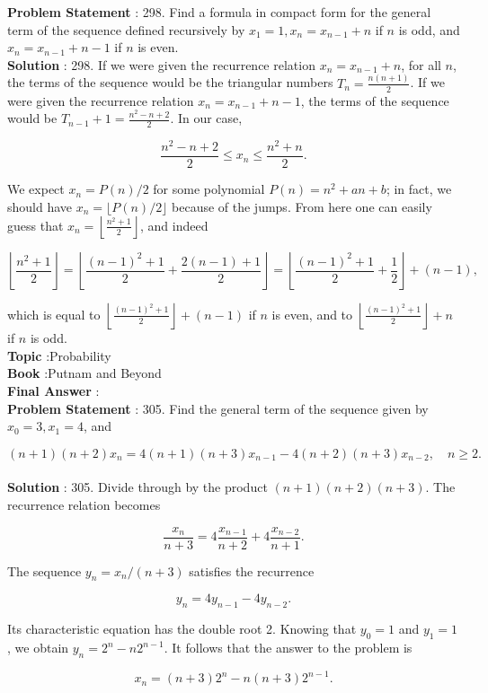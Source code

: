 \documentclass[10pt]{article}
\begin{document}
\textbf{Problem Statement} :
298. Find a formula in compact form for the general term of the sequence defined recursively by $x_{1}=1, x_{n}=x_{n-1}+n$ if $n$ is odd, and $x_{n}=x_{n-1}+n-1$ if $n$ is even.
\\
\textbf{Solution} :
298. If we were given the recurrence relation $x_{n}=x_{n-1}+n$, for all $n$, the terms of the sequence would be the triangular numbers $T_{n}=\frac{n(n+1)}{2}$. If we were given the recurrence relation $x_{n}=x_{n-1}+n-1$, the terms of the sequence would be $T_{n-1}+1=\frac{n^{2}-n+2}{2}$. In our case,

$$
\frac{n^{2}-n+2}{2} \leq x_{n} \leq \frac{n^{2}+n}{2} .
$$

We expect $x_{n}=P(n) / 2$ for some polynomial $P(n)=n^{2}+a n+b$; in fact, we should have $x_{n}=\lfloor P(n) / 2\rfloor$ because of the jumps. From here one can easily guess that $x_{n}=\left\lfloor\frac{n^{2}+1}{2}\right\rfloor$, and indeed

$$
\left\lfloor\frac{n^{2}+1}{2}\right\rfloor=\left\lfloor\frac{(n-1)^{2}+1}{2}+\frac{2(n-1)+1}{2}\right\rfloor=\left\lfloor\frac{(n-1)^{2}+1}{2}+\frac{1}{2}\right\rfloor+(n-1),
$$

which is equal to $\left\lfloor\frac{(n-1)^{2}+1}{2}\right\rfloor+(n-1)$ if $n$ is even, and to $\left\lfloor\frac{(n-1)^{2}+1}{2}\right\rfloor+n$ if $n$ is odd. 
\\
\textbf{Topic} :Probability\\
\textbf{Book} :Putnam and Beyond\\
\textbf{Final Answer} :\\


\textbf{Problem Statement} :
305. Find the general term of the sequence given by $x_{0}=3, x_{1}=4$, and

$$
(n+1)(n+2) x_{n}=4(n+1)(n+3) x_{n-1}-4(n+2)(n+3) x_{n-2}, \quad n \geq 2 .
$$
\\
\textbf{Solution} :
305. Divide through by the product $(n+1)(n+2)(n+3)$. The recurrence relation becomes

$$
\frac{x_{n}}{n+3}=4 \frac{x_{n-1}}{n+2}+4 \frac{x_{n-2}}{n+1} .
$$

The sequence $y_{n}=x_{n} /(n+3)$ satisfies the recurrence

$$
y_{n}=4 y_{n-1}-4 y_{n-2} .
$$

Its characteristic equation has the double root 2. Knowing that $y_{0}=1$ and $y_{1}=1$, we obtain $y_{n}=2^{n}-n 2^{n-1}$. It follows that the answer to the problem is

$$
x_{n}=(n+3) 2^{n}-n(n+3) 2^{n-1} .
$$
\end{document}
